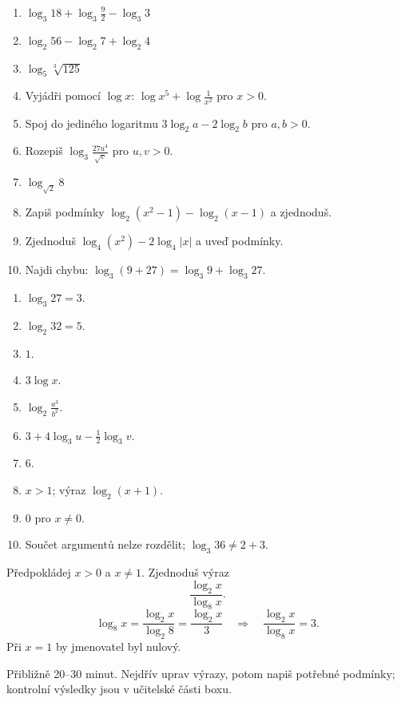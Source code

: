 \documentclass[11pt,a4paper]{article}
\begin{document}
\begin{zadaniReseniBox}[title={Samostatná práce 1}]
\begin{enumerate}[label=\alph*)]
\item $\log_3 18+\log_3\frac92-\log_3 3$
\item $\log_2 56-\log_2 7+\log_2 4$
\item $\log_5\sqrt[3]{125}$
\item Vyjádři pomocí $\log x$: $\log x^5+\log\frac1{x^2}$ pro $x>0$.
\item Spoj do jediného logaritmu $3\log_2 a-2\log_2 b$ pro $a,b>0$.
\item Rozepiš $\log_3\frac{27u^4}{\sqrt{v}}$ pro $u,v>0$.
\item $\log_{\sqrt2}8$
\item Zapiš podmínky $\log_2(x^2-1)-\log_2(x-1)$ a zjednoduš.
\item Zjednoduš $\log_4(x^2)-2\log_4|x|$ a uveď podmínky.
\item Najdi chybu: $\log_3(9+27)=\log_3 9+\log_3 27$.
\end{enumerate}
\tcblower
\begin{enumerate}[label=\alph*)]
\item $\log_3 27=3$.
\item $\log_2 32=5$.
\item $1$.
\item $3\log x$.
\item $\log_2\frac{a^3}{b^2}$.
\item $3+4\log_3 u-\frac12\log_3 v$.
\item $6$.
\item $x>1$; výraz $\log_2(x+1)$.
\item $0$ pro $x\ne0$.
\item Součet argumentů nelze rozdělit; $\log_3 36\ne2+3$.
\end{enumerate}
\end{zadaniReseniBox}
\begin{prikladReseniBox}[title={Rozšíření 1}]
Předpokládej $x>0$ a $x\ne1$. Zjednoduš výraz
\[
\frac{\log_2 x}{\log_8 x}.
\]
\tcblower
\[
\log_8 x=\frac{\log_2 x}{\log_2 8}=\frac{\log_2x}{3}
\quad\Longrightarrow\quad\frac{\log_2 x}{\log_8x}=3.
\]
Při $x=1$ by jmenovatel byl nulový.
\end{prikladReseniBox}
Přibližně 20--30 minut. Nejdřív uprav výrazy, potom napiš potřebné podmínky; kontrolní výsledky jsou v učitelské části boxu.
\end{document}

